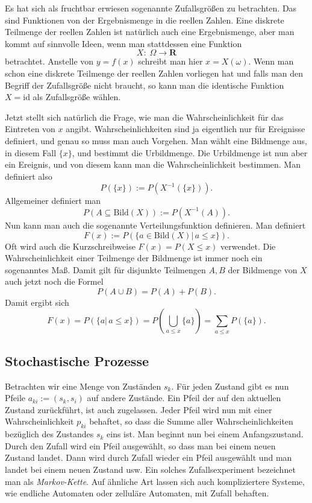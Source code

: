 \documentclass[a4paper,10pt,fleqn,twocolumn,twoside]{article}
\begin{document}
Es hat sich als fruchtbar erwiesen sogenannte Zufallsgrößen zu
betrachten. Das sind Funktionen von der Ergebnismenge in die reellen
Zahlen. Eine diskrete Teilmenge der reellen Zahlen ist natürlich auch
eine Ergebnismenge, aber man kommt auf sinnvolle Ideen, wenn man
stattdessen eine Funktion
\[X{:}\;\Omega\rightarrow\mathbf R\]
betrachtet. Anstelle von \(y=f(x)\) schreibt man hier \(x=X(\omega)\).
Wenn man schon eine diskrete Teilmenge der reellen Zahlen vorliegen
hat und falls man den Begriff der Zufallsgröße nicht braucht, so kann
man die identische Funktion \(X=\mathrm{id}\) als Zufallsgröße wählen.

Jetzt stellt sich natürlich die Frage, wie man die
Wahrscheinlichkeit für das Eintreten von \(x\) angibt.
Wahrscheinlichkeiten sind ja eigentlich nur für Ereignisse definiert,
und genau so muss man auch Vorgehen. Man wählt eine Bildmenge aus,
in diesem Fall \(\{x\}\), und bestimmt die Urbildmenge.
Die Urbildmenge ist nun aber ein Ereignis, und von diesem kann man
die Wahrscheinlichkeit bestimmen. Man definiert also
\[P(\{x\}) := P(X^{-1}(\{x\})).\]
Allgemeiner definiert man
\[P(A\subseteq \mathrm{Bild}(X)) := P(X^{-1}(A)).\]
Nun kann man auch die sogenannte Verteilungsfunktion definieren.
Man definiert
\[F(x) := P(\{a{\in}\mathrm{Bild}(X)|\,a\le x\}).\]
Oft wird auch die Kurzschreibweise \(F(x)=P(X\le x)\) verwendet.
Die Wahrscheinlichkeit einer Teilmenge der Bildmenge ist immer noch
ein sogenanntes Maß. Damit gilt für disjunkte Teilmengen \(A,B\)
der Bildmenge von \(X\) auch jetzt noch die Formel
\[P(A\cup B) = P(A)+P(B).\]
Damit ergibt sich
\[F(x) = P(\{a|\,a\le x\})
= P(\bigcup_{a\le x}\{a\}) = \sum_{a\le x} P(\{a\}).\]


\subsection{Stochastische Prozesse}
Betrachten wir eine Menge von Zuständen \(s_k\). Für jeden
Zustand gibt es nun Pfeile \(a_{ki}:=(s_k,s_i)\) auf andere Zustände.
Ein Pfeil der auf den aktuellen Zustand zurückführt, ist auch
zugelassen. Jeder Pfeil wird nun mit einer Wahrscheinlichkeit
\(p_{ki}\) behaftet, so dass die Summe aller Wahrscheinlichkeiten
bezüglich des Zustandes \(s_k\) eins ist. Man beginnt nun bei einem
Anfangszustand. Durch den Zufall wird ein Pfeil ausgewählt, so dass
man bei einem neuen Zustand landet. Dann wird durch Zufall wieder
ein Pfeil ausgewählt und man landet bei einem neuen Zustand usw.
Ein solches Zufallsexperiment bezeichnet man als
\textit{Markov-Kette}. Auf ähnliche Art lassen sich auch
kompliziertere Systeme, wie endliche Automaten oder zelluläre
Automaten, mit Zufall behaften.
\end{document}
